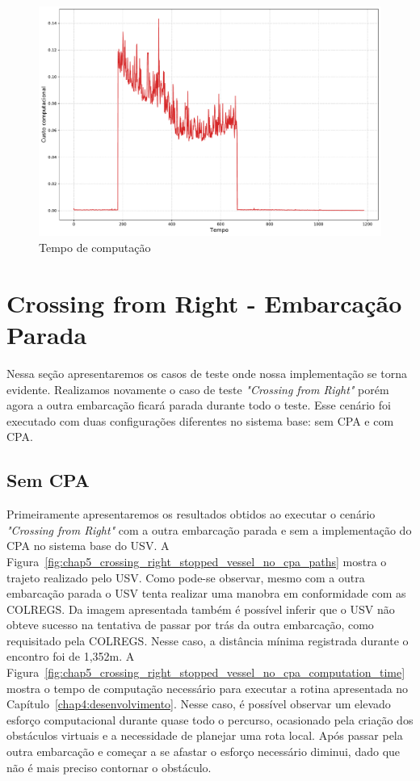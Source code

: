         \begin{figure}[H]
            \centering
            \includegraphics[width=\textwidth]{fig/chap5/crossing_right_computation_time.pdf}
            \caption{Tempo de computação}
            \label{fig:chap5_crossing_right_computation_time}
        \end{figure}
        
    \section{Crossing from Right - Embarcação Parada}
        Nessa seção apresentaremos os casos de teste onde nossa implementação se torna evidente. Realizamos novamente o caso de teste \textit{"Crossing from Right"} porém agora a outra embarcação ficará parada durante todo o teste. Esse cenário foi executado com duas configurações diferentes no sistema base: sem CPA e com CPA.
    
        \subsection{Sem CPA}
            Primeiramente apresentaremos os resultados obtidos ao executar o cenário \textit{"Crossing from Right"} com a outra embarcação parada e sem a implementação do CPA no sistema base do USV. A Figura~\ref{fig:chap5_crossing_right_stopped_vessel_no_cpa_paths} mostra o trajeto realizado pelo USV. Como pode-se observar, mesmo com a outra embarcação parada o USV tenta realizar uma manobra em conformidade com as COLREGS. Da imagem apresentada também é possível inferir que o USV não obteve sucesso na tentativa de passar por trás da outra embarcação, como requisitado pela COLREGS. Nesse caso, a distância mínima registrada durante o encontro foi de 1,352m. A Figura~\ref{fig:chap5_crossing_right_stopped_vessel_no_cpa_computation_time} mostra o tempo de computação necessário para executar a rotina apresentada no Capítulo~\ref{chap4:desenvolvimento}. Nesse caso, é possível observar um elevado esforço computacional durante quase todo o percurso, ocasionado pela criação dos obstáculos virtuais e a necessidade de planejar uma rota local. Após passar pela outra embarcação e começar a se afastar o esforço necessário diminui, dado que não é mais preciso contornar o obstáculo.
    

